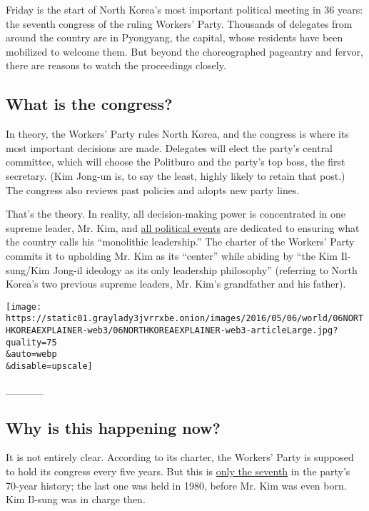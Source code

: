 Friday is the start of North Korea's most important political meeting in
36 years: the seventh congress of the ruling Workers' Party. Thousands
of delegates from around the country are in Pyongyang, the capital,
whose residents have been mobilized to welcome them. But beyond the
choreographed pageantry and fervor, there are reasons to watch the
proceedings closely.

\hypertarget{what-is-the-congress}{%
\subsection{What is the congress?}\label{what-is-the-congress}}

In theory, the Workers' Party rules North Korea, and the congress is
where its most important decisions are made. Delegates will elect the
party's central committee, which will choose the Politburo and the
party's top boss, the first secretary. (Kim Jong-un is, to say the
least, highly likely to retain that post.) The congress also reviews
past policies and adopts new party lines.

That's the theory. In reality, all decision-making power is concentrated
in one supreme leader, Mr. Kim, and
\href{http://www.nytimes3xbfgragh.onion/2016/05/05/world/asia/north-korea-congress-kim-jong-un.html}{all
political events} are dedicated to ensuring what the country calls his
``monolithic leadership.'' The charter of the Workers' Party commits it
to upholding Mr. Kim as its ``center'' while abiding by ``the Kim
Il-sung/Kim Jong-il ideology as its only leadership philosophy''
(referring to North Korea's two previous supreme leaders, Mr. Kim's
grandfather and his father).

\texttt{[image: https://static01.graylady3jvrrxbe.onion/images/2016/05/06/world/06NORTHKOREAEXPLAINER-web3/06NORTHKOREAEXPLAINER-web3-articleLarge.jpg?quality=75\\\&auto=webp\\\&disable=upscale]}

\_\_\_\_\_

\hypertarget{why-is-this-happening-now}{%
\subsection{Why is this happening
now?}\label{why-is-this-happening-now}}

It is not entirely clear. According to its charter, the Workers' Party
is supposed to hold its congress every five years. But this is
\href{http://www.nytimes3xbfgragh.onion/2016/04/28/world/asia/north-korea-party-congress.html}{only
the seventh} in the party's 70-year history; the last one was held in
1980, before Mr. Kim was even born. Kim Il-sung was in charge then.

